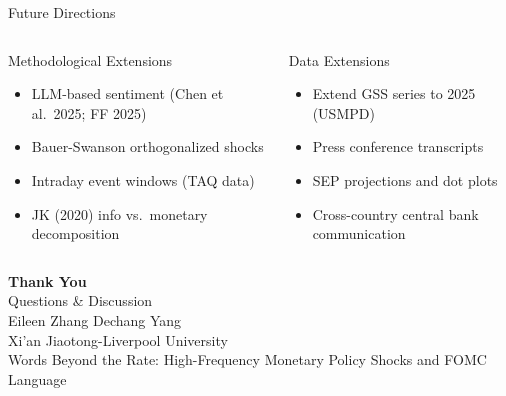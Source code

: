 \documentclass[aspectratio=169, 11pt]{beamer}
\begin{document}
\begin{frame}{Future Directions}
\begin{columns}[T]
\begin{ablock}{Methodological Extensions}
\begin{itemize}
  \item LLM-based sentiment (Chen et al.\ 2025; FF 2025)
  \item Bauer-Swanson orthogonalized shocks
  \item Intraday event windows (TAQ data)
  \item JK (2020) info vs.\ monetary decomposition
\end{itemize}
\end{ablock}

\begin{ablock}{Data Extensions}
\begin{itemize}
  \item Extend GSS series to 2025 (USMPD)
  \item Press conference transcripts
  \item SEP projections and dot plots
  \item Cross-country central bank communication
\end{itemize}
\end{ablock}
\end{columns}

\vspace{0.5em}
\begin{center}
\end{center}
\end{frame}

\begin{frame}[plain]
\begin{center}
\vspace{2cm}
{\LARGE\bfseries Thank You}\\[1em]
{\large Questions \& Discussion}\\[2em]
{\small Eileen Zhang \quad Dechang Yang}\\[0.3em]
{\small Xi'an Jiaotong-Liverpool University}\\[0.5em]
{\footnotesize Words Beyond the Rate: High-Frequency Monetary Policy Shocks and FOMC Language}
\end{center}
\end{frame}
\end{document}

